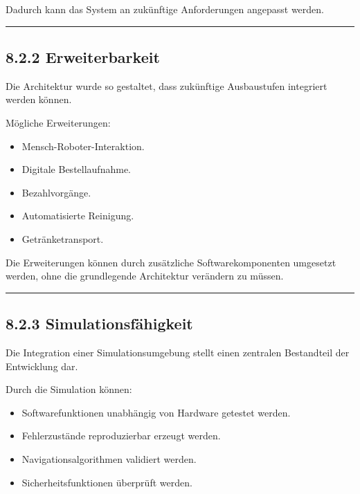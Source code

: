 \documentclass[
]{article}
\providecommand{\tightlist}{%
  \setlength{\itemsep}{0pt}\setlength{\parskip}{0pt}}
\begin{document}
Dadurch kann das System an zukünftige Anforderungen angepasst werden.

\begin{center}\rule{0.5\linewidth}{0.5pt}\end{center}

\subsection{8.2.2 Erweiterbarkeit}\label{erweiterbarkeit}

Die Architektur wurde so gestaltet, dass zukünftige Ausbaustufen
integriert werden können.

Mögliche Erweiterungen:

\begin{itemize}
\tightlist
\item
  Mensch-Roboter-Interaktion.
\item
  Digitale Bestellaufnahme.
\item
  Bezahlvorgänge.
\item
  Automatisierte Reinigung.
\item
  Getränketransport.
\end{itemize}

Die Erweiterungen können durch zusätzliche Softwarekomponenten umgesetzt
werden, ohne die grundlegende Architektur verändern zu müssen.

\begin{center}\rule{0.5\linewidth}{0.5pt}\end{center}

\subsection{8.2.3 Simulationsfähigkeit}\label{simulationsfuxe4higkeit}

Die Integration einer Simulationsumgebung stellt einen zentralen
Bestandteil der Entwicklung dar.

Durch die Simulation können:

\begin{itemize}
\tightlist
\item
  Softwarefunktionen unabhängig von Hardware getestet werden.
\item
  Fehlerzustände reproduzierbar erzeugt werden.
\item
  Navigationsalgorithmen validiert werden.
\item
  Sicherheitsfunktionen überprüft werden.
\end{itemize}
\end{document}
